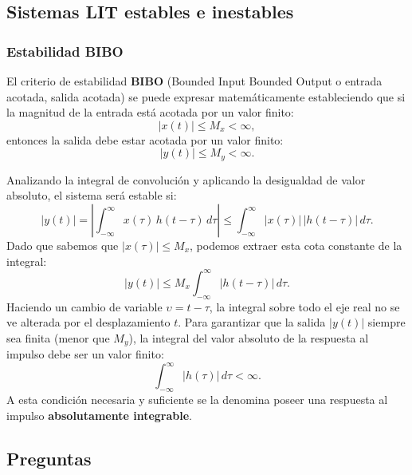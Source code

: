 \documentclass[11pt,a4paper,openany]{book}
\begin{document}
\subsection{Sistemas LIT estables e inestables}

\subsubsection{Estabilidad BIBO}

El criterio de estabilidad \textbf{BIBO} (Bounded Input Bounded Output o entrada acotada, salida acotada) se puede expresar matemáticamente estableciendo que si la magnitud de la entrada está acotada por un valor finito:
\begin{equation}
	|x(t)| \leq M_{x} < \infty,
\end{equation}
entonces la salida debe estar acotada por un valor finito:
\begin{equation}
	|y(t)| \leq M_{y} < \infty.
\end{equation}

Analizando la integral de convolución y aplicando la desigualdad de valor absoluto, el sistema será estable si:
\begin{equation}
	|y(t)| = \left| \int_{-\infty }^{\infty } x(\tau) \, h(t-\tau) \, d\tau \right| \leq \int_{-\infty }^{\infty } |x(\tau)| \, |h(t-\tau)| \, d\tau .
\end{equation}
Dado que sabemos que $|x(\tau)| \leq M_x$, podemos extraer esta cota constante de la integral:
\begin{equation}
	|y(t)| \leq M_{x} \int_{-\infty }^{\infty } |h(t-\tau)| \, d\tau.
\end{equation}
Haciendo un cambio de variable $\upsilon = t - \tau$, la integral sobre todo el eje real no se ve alterada por el desplazamiento $t$. Para garantizar que la salida $|y(t)|$ siempre sea finita (menor que $M_y$), la integral del valor absoluto de la respuesta al impulso debe ser un valor finito:
\begin{equation}
	\int_{-\infty }^{\infty } |h(\tau)| \, d\tau < \infty.
\end{equation}
A esta condición necesaria y suficiente se la denomina poseer una respuesta al impulso \textbf{absolutamente integrable}.

\subsection{Preguntas}
\end{document}

